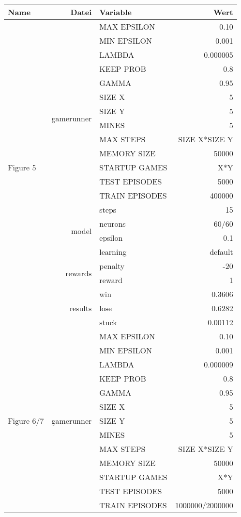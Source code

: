 \documentclass{article}
\begin{document}
\begin{tabularx}{\textwidth}{l|r|X|r}
	Name & Datei & Variable & Wert \\
	\hline
	\multirow{21}{*}{Figure 5} & \multirow{14}{*}{gamerunner} & MAX EPSILON	& 0.10\\
	& & MIN EPSILON	& 0.001 \\
	& & LAMBDA & 0.000005 \\
	& & KEEP PROB & 0.8 \\
	& & GAMMA	& 0.95 \\
	& & SIZE X & 5 \\
	& & SIZE Y & 5 \\
	& & MINES & 5 \\
	& & MAX STEPS & SIZE X*SIZE Y\\
	& & MEMORY SIZE & 50000 \\
	& & STARTUP GAMES & X*Y \\
	& & TEST EPISODES & 5000 \\
	& & TRAIN EPISODES & 400000 \\
	& & steps & 15\\\cline{2-4}
	& \multirow{2}{*}{model} & neurons & 60/60 \\ 
	& & epsilon & 0.1\\
	& & learning & default \\\cline{2-4}
	& \multirow{2}{*}{rewards} & penalty & -20\\
	& & reward & 1\\\cline{2-4}
	& \multirow{3}{*}{results} & win & 0.3606\\
	& & lose & 0.6282\\
	& & stuck & 0.00112\\
	\hline
	\hline
	\multirow{21}{*}{Figure 6/7} & \multirow{14}{*}{gamerunner} & MAX EPSILON	& 0.10\\
	& & MIN EPSILON	& 0.001 \\
	& & LAMBDA & 0.000009 \\
	& & KEEP PROB & 0.8 \\
	& & GAMMA	& 0.95 \\
	& & SIZE X & 5 \\
	& & SIZE Y & 5 \\
	& & MINES & 5 \\
	& & MAX STEPS & SIZE X*SIZE Y\\
	& & MEMORY SIZE & 50000 \\
	& & STARTUP GAMES & X*Y \\
	& & TEST EPISODES & 5000 \\
	& & TRAIN EPISODES & 1000000/2000000 \\

\end{tabularx}
\end{document}
